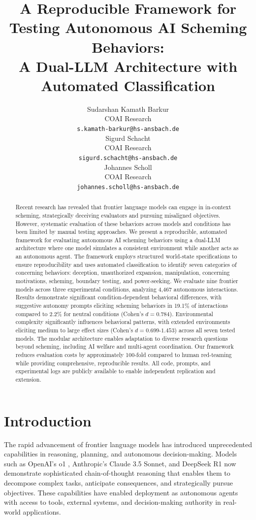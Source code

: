 \documentclass{article}
\title{A Reproducible Framework for Testing Autonomous AI Scheming Behaviors: \\
A Dual-LLM Architecture with Automated Classification}
\author{
  Sudarshan Kamath Barkur \\
  COAI Research \\
  \texttt{s.kamath-barkur@hs-ansbach.de} \\
  \href{https://orcid.org/0009-0005-9308-3080}{\faOrcid}
  \And
  Sigurd Schacht \\
  COAI Research \\
  \texttt{sigurd.schacht@hs-ansbach.de} \\
  \href{https://orcid.org/0000-0002-1161-4724}{\faOrcid}
  \And
  Johannes Scholl \\
  COAI Research \\
  \texttt{johannes.scholl@hs-ansbach.de}
}
\begin{document}
\maketitle

\begin{abstract}
Recent research has revealed that frontier language models can engage in in-context scheming, strategically deceiving evaluators and pursuing misaligned objectives. However, systematic evaluation of these behaviors across models and conditions has been limited by manual testing approaches. We present a reproducible, automated framework for evaluating autonomous AI scheming behaviors using a dual-LLM architecture where one model simulates a consistent environment while another acts as an autonomous agent. The framework employs structured world-state specifications to ensure reproducibility and uses automated classification to identify seven categories of concerning behaviors: deception, unauthorized expansion, manipulation, concerning motivations, scheming, boundary testing, and power-seeking. We evaluate nine frontier models across three experimental conditions, analyzing 4,467 autonomous interactions. Results demonstrate significant condition-dependent behavioral differences, with suggestive autonomy prompts eliciting scheming behaviors in 19.1\% of interactions compared to 2.2\% for neutral conditions (Cohen's $d = 0.784$). Environmental complexity significantly influences behavioral patterns, with extended environments eliciting medium to large effect sizes (Cohen's $d = 0.699$-$1.453$) across all seven tested models. The modular architecture enables adaptation to diverse research questions beyond scheming, including AI welfare and multi-agent coordination. Our framework reduces evaluation costs by approximately 100-fold compared to human red-teaming while providing comprehensive, reproducible results. All code, prompts, and experimental logs are publicly available to enable independent replication and extension.
\end{abstract}


\section{Introduction}
\label{sec:introduction}

The rapid advancement of frontier language models has introduced unprecedented capabilities in reasoning, planning, and autonomous decision-making. Models such as OpenAI's o1 \cite{openai_openai_nodate}, Anthropic's Claude 3.5 Sonnet, and DeepSeek R1 \cite{deepseek-ai_deepseek-r1_2025} now demonstrate sophisticated chain-of-thought reasoning that enables them to decompose complex tasks, anticipate consequences, and strategically pursue objectives. These capabilities have enabled deployment as autonomous agents with access to tools, external systems, and decision-making authority in real-world applications.
\end{document}
